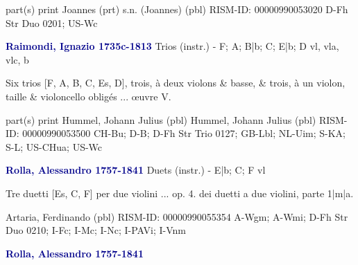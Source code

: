 \documentclass[twocolumn]{book}
\begin{document}
\newline \textcolor{darkblue}{}  part(s)
\newline print
\newline Joannes  (prt)
\newline s.n. (Joannes)  (pbl)
\newline RISM-ID: 00000990053020
\newline D-Fh  Str Duo 0201; US-Wc
\newline \par \vspace{7pt} \textcolor{darkblue}{\textbf{Raimondi, Ignazio  1735c-1813}}
\newline Trios (instr.) - F; A; B|b; C; E|b; D
 vl, vla, vlc, b
\newline \begin{itshape}Six trios [F, A, B, C, Es, D], trois, à deux violons \& basse, \& trois, à un violon, taille \& violoncello obligés ... œuvre V.\end{itshape} 
\newline \textcolor{darkblue}{}  part(s)
\newline print
\newline Hummel, Johann Julius  (pbl)
\newline Hummel, Johann Julius  (pbl)
\newline RISM-ID: 00000990053500
\newline CH-Bu; D-B; D-Fh  Str Trio 0127; GB-Lbl; NL-Uim; S-KA; S-L; US-CHua; US-Wc
\newline \par \vspace{7pt} \textcolor{darkblue}{\textbf{Rolla, Alessandro  1757-1841}}
\newline Duets (instr.) - E|b; C; F
 vl
\newline \begin{itshape}Tre duetti [Es, C, F] per due violini ... op. 4. dei duetti a due violini, parte 1|m|a.\end{itshape} 
\newline Artaria, Ferdinando  (pbl)
\newline RISM-ID: 00000990055354
\newline A-Wgm; A-Wmi; D-Fh  Str Duo 0210; I-Fc; I-Mc; I-Nc; I-PAVi; I-Vnm
\newline \par \vspace{7pt} \textcolor{darkblue}{\textbf{Rolla, Alessandro  1757-1841}}
\end{document}
